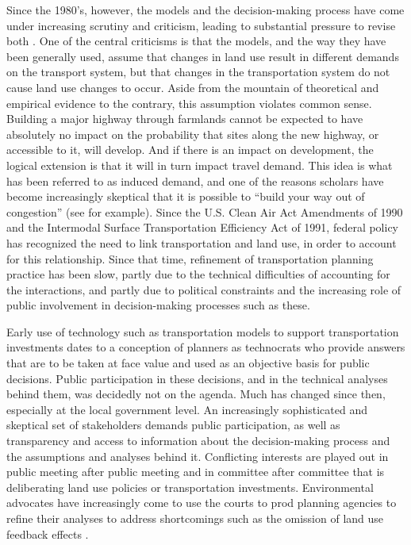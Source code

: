 Since the 1980's, however, the models and the decision-making process have
come under increasing scrutiny and criticism, leading to substantial
pressure to revise both \cite{beimborn-1996}.  One of the central
criticisms is that the models, and the way they have been generally used,
assume that changes in land use result in different demands on the
transport system, but that changes in the transportation system do not
cause land use changes to occur.  Aside from the mountain of theoretical
and empirical evidence to the contrary, this assumption violates common
sense.  Building a major highway through farmlands cannot be expected to
have absolutely no impact on the probability that sites along the new
highway, or accessible to it, will develop.  And if there is an impact on
development, the logical extension is that it will in turn impact travel
demand.  This idea is what has been referred to as induced demand, and one
of the reasons scholars have become increasingly skeptical that it is
possible to ``build your way out of congestion'' (see \cite{downs-2004} for
example).  Since the U.S. Clean Air Act Amendments of 1990 and the Intermodal
Surface Transportation Efficiency Act of 1991, federal policy has
recognized the need to link transportation and land use, in order to
account for this relationship.  Since that time, refinement of
transportation planning practice has been slow, partly due to the technical
difficulties of accounting for the interactions, and partly due to
political constraints and the increasing role of public involvement in
decision-making processes such as these.

Early use of technology such as transportation models to support
transportation investments dates to a conception of planners as technocrats
who provide answers that are to be taken at face value and used as an
objective basis for public decisions.  Public participation in these
decisions, and in the technical analyses behind them, was decidedly not on
the agenda.  Much has changed since then, especially at the local
government level.  An increasingly sophisticated and skeptical set of
stakeholders demands public participation, as well as transparency and
access to information about the decision-making process and the assumptions
and analyses behind it.  Conflicting interests are played out in public
meeting after public meeting and in committee after committee that is
deliberating land use policies or transportation investments.
Environmental advocates have increasingly come to use the courts to prod
planning agencies to refine their analyses to address shortcomings such as
the omission of land use feedback effects \cite{garret-1996}.

